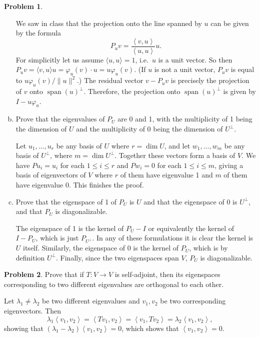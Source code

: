 \documentclass[11pt,oneside]{amsart}
\theoremstyle{definition}
\newtheorem{problem}{Problem}
\newcommand{\innerprod}[1]{\left\langle#1\right\rangle}
\DeclareMathOperator{\Span}{span}
\begin{document}
\begin{problem}
\begin{enumerate}[(a)]
\begin{solution}
                We saw in class that the projection onto the line spanned by $u$ can be given by the formula
                \[P_uv=\frac{\innerprod{v,u}}{\innerprod{u,u}}u.\]
                For simplicitly let us assume $\langle u,u\rangle=1$, i.e.\ $u$ is a unit vector. So then $P_uv=\langle v,u\rangle u=\varphi_u(v)\cdot u=u\varphi_u(v)$. (If $u$ is not a unit vector, $P_uv$ is equal to $u\varphi_u(v)/\|u\|^2$.) The residual vector $v-P_uv$ is precisely the projection of $v$ onto $\Span(u)^\perp$. Therefore, the projection onto $\Span(u)^\perp$ is given by $I-u\varphi_u$.
            \end{solution}
            \item Prove that the eigenvalues of $P_U$ are 0 and 1, with the multiplicity of 1 being the dimension of $U$ and the multiplicity of 0 being the dimension of $U^\perp$.
            \begin{solution}
                Let $u_1,\dots, u_r$ be any basis of $U$ where $r=\dim U$, and let $w_1,\dots, w_m$ be any basis of $U^\perp$, where $m=\dim U^\perp$. Together these vectors form a basis of $V$. We have $Pu_i=u_i$ for each $1\leq i\leq r$ and $Pw_i=0$ for each $1\leq i\leq m$, giving a basis of eigenvectors of $V$ where $r$ of them have eigenvalue 1 and $m$ of them have eigenvalue 0. This finishes the proof.
            \end{solution}
            \item Prove that the eigenspace of 1 of $P_U$ is $U$ and that the eigenspace of 0 is $U^\perp$, and that $P_U$ is diagonalizable.
            \begin{solution}
                The eigenspace of 1 is the kernel of $P_U-I$ or equivalently the kernel of $I-P_U$, which is just $P_{U^\perp}$. In any of these formulations it is clear the kernel is $U$ itself. Similarly, the eigenspace of 0 is the kernel of $P_U$, which is by definition $U^\perp$. Finally, since the two eigenspaces span $V$, $P_U$ is diagonalizable.
            \end{solution}
        \end{enumerate}
    \end{problem}

    \begin{problem}
        Prove that if $T\colon V\to V$ is self-adjoint, then its eigenspaces corresponding to two different eigenvalues are orthogonal to each other.
    \end{problem}
    \begin{solution}
        Let $\lambda_1\neq \lambda_2$ be two different eigenvalues and $v_1,v_2$ be two corresponding eigenvectors. Then
        \[\lambda_1\innerprod{v_1,v_2}=\innerprod{Tv_1,v_2}=\innerprod{v_1,Tv_2}=\lambda_2\innerprod{v_1,v_2},\]
        showing that $(\lambda_1-\lambda_2)\innerprod{v_1,v_2}=0$, which shows that $\innerprod{v_1,v_2}=0$.
    \end{solution}
\end{document}
